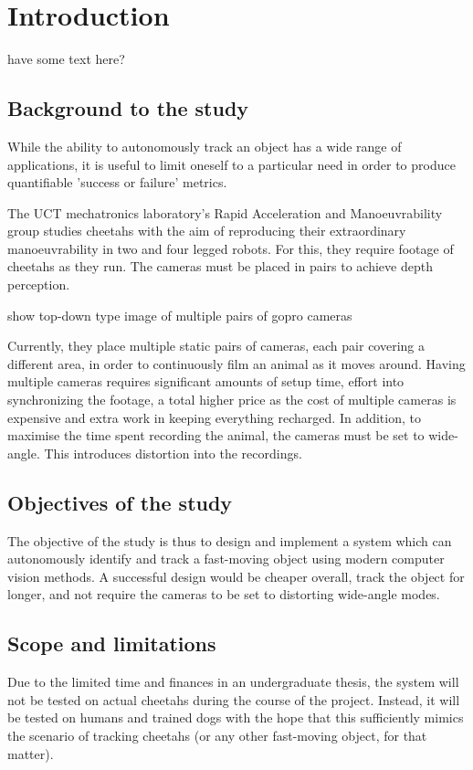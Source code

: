 \chapter{Introduction}
{\Large \color{red} have some text here? }
\section{Background to the study}

While the ability to autonomously track an object has a wide range of applications, it is useful to limit oneself to a particular need in order to produce quantifiable 'success or failure' metrics.

The UCT mechatronics laboratory's Rapid Acceleration and Manoeuvrability group studies cheetahs with the aim of reproducing their extraordinary manoeuvrability in two and four legged robots. For this, they require footage of cheetahs as they run. The cameras must be placed in pairs to achieve depth perception.

\vskip 15mm
{\Large \color{red} show top-down type image of multiple pairs of gopro cameras}
\vskip 15mm

Currently, they place multiple static pairs of cameras, each pair covering a different area, in order to continuously film an animal as it moves around. Having multiple cameras requires significant amounts of setup time, effort into synchronizing the footage, a total higher price as the cost of multiple cameras is expensive and extra work in keeping everything recharged. In addition, to maximise the time spent recording the animal, the cameras must be set to wide-angle. This introduces distortion into the recordings.


\section{Objectives of the study}
The objective of the study is thus to design and implement a system which can autonomously identify and track a fast-moving object using modern computer vision methods. A successful design would be cheaper overall, track the object for longer, and not require the cameras to be set to distorting wide-angle modes.


\section{Scope and limitations}
Due to the limited time and finances in an undergraduate thesis, the system will not be tested on actual cheetahs during the course of the project. Instead, it will be tested on humans and trained dogs with the hope that this sufficiently mimics the scenario of tracking cheetahs (or any other fast-moving object, for that matter).

